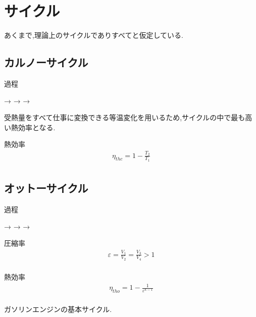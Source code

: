 \documentclass[a4paper]{jsarticle}
\begin{document}
\section{サイクル}
あくまで,理論上のサイクルでありすべてと仮定している.
\subsection{カルノーサイクル}
\begin{itembox}[l]{過程}
    \begin{center}
        \quad → \quad {} \quad → \quad {} \quad → \quad {}
    \end{center}
\end{itembox}
受熱量をすべて仕事に変換できる等温変化を用いるため,サイクルの中で最も高い熱効率となる.
\begin{itembox}[l]{熱効率}
    \begin{eqnarray*}
        \eta_{thc}=1-\frac{T_2}{T_1}\\
    \end{eqnarray*}
\end{itembox}
\subsection{オットーサイクル}
\begin{itembox}[l]{過程}
    \begin{center}
        \quad → \quad {} \quad → \quad {} \quad → \quad {}
    \end{center}
\end{itembox}
\begin{itembox}[l]{圧縮率}
    \begin{eqnarray*}
        \varepsilon=\frac{V_1}{V_2}=\frac{V_3}{V_4}> 1\\
    \end{eqnarray*}
\end{itembox}
\begin{itembox}[l]{熱効率}
    \begin{eqnarray*}
        \eta_{tho}=1-\frac{1}{\varepsilon^{\kappa-1}}\\
    \end{eqnarray*}
\end{itembox}
ガソリンエンジンの基本サイクル.
\end{document}
